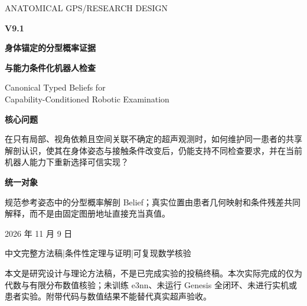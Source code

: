 \documentclass[UTF8,fontset=fandol,11pt,a4paper]{ctexart}
\theoremstyle{plain}
\theoremstyle{definition}
\theoremstyle{remark}
\numberwithin{equation}{section}
\begin{document}
\begin{titlepage}
\vspace*{8mm}
{\Large\sffamily\color{accent}ANATOMICAL GPS\quad /\quad RESEARCH DESIGN}\par
\vspace{14mm}
{\fontsize{38}{44}\selectfont\bfseries\color{ink}V9.1}\par
\vspace{9mm}
{\fontsize{25}{34}\selectfont\bfseries\color{ink}身体锚定的分型概率证据}\par
\vspace{3mm}
{\fontsize{25}{34}\selectfont\bfseries\color{ink}与能力条件化机器人检查}\par
\vspace{9mm}
{\large Canonical Typed Beliefs for\\Capability-Conditioned Robotic Examination}\par
\vspace{12mm}
\begin{corebox}
\textbf{核心问题}\par
在只有局部、视角依赖且空间关联不确定的超声观测时，如何维护同一患者的共享解剖认识，使其在身体姿态与接触条件改变后，仍能支持不同检查要求，并在当前机器人能力下重新选择可信实现？
\medskip\par
\textbf{统一对象}\par
规范参考姿态中的分型概率解剖 Belief；真实位置由患者几何映射和条件残差共同解释，而不是由固定图册地址直接充当真值。
\end{corebox}
\vfill
{\large 2026 年 11 月 9 日}\par
\vspace{3mm}
{\color{muted}中文完整方法稿\quad |\quad 条件性定理与证明\quad |\quad 可复现数学核验}\par
\vspace{5mm}
{\small 本文是研究设计与理论方法稿，不是已完成实验的投稿终稿。本次实际完成的仅为代数与有限分布数值核验；未训练 e3nn、未运行 Genesis 全闭环、未进行实机或患者实验。附带代码与数值结果不能替代真实超声验收。}
\end{titlepage}
\end{document}
